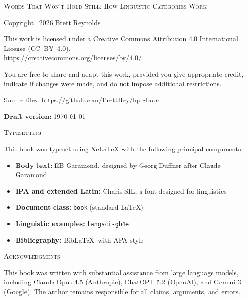 
\thispagestyle{empty}
\vspace*{\fill}

\begin{center}
\textsc{Words That Won't Hold Still: How Linguistic Categories Work}
\end{center}

\vspace{1em}

\noindent Copyright \textcopyright\ 2026 Brett Reynolds

\vspace{1em}

\noindent This work is licensed under a Creative Commons Attribution 4.0 International License (CC~BY~4.0).\\
\url{https://creativecommons.org/licenses/by/4.0/}

\vspace{0.5em}

\noindent You are free to share and adapt this work, provided you give appropriate credit, indicate if changes were made, and do not impose additional restrictions.

\vspace{1em}

\noindent Source files: \url{https://github.com/BrettRey/hpc-book}

\vspace{2em}

\noindent\textbf{Draft version:} \today

\vspace{2em}

\noindent\textsc{Typesetting}

\vspace{0.5em}

\noindent This book was typeset using XeLaTeX with the following principal components:

\begin{itemize}[nosep, leftmargin=2em]
  \item \textbf{Body text:} EB Garamond, designed by Georg Duffner after Claude Garamond
  \item \textbf{IPA and extended Latin:} Charis SIL, a font designed for linguistics
  \item \textbf{Document class:} \texttt{book} (standard \LaTeX)
  \item \textbf{Linguistic examples:} \texttt{langsci-gb4e}
  \item \textbf{Bibliography:} Bib\LaTeX\ with APA style
\end{itemize}

\vspace{2em}

\noindent\textsc{Acknowledgments}

\vspace{0.5em}

\noindent This book was written with substantial assistance from large language 
models, including Claude Opus 4.5 (Anthropic), ChatGPT 5.2 (OpenAI), and Gemini 3 
(Google). The author remains responsible for all claims, arguments, and errors.

\vspace*{\fill}
\clearpage
